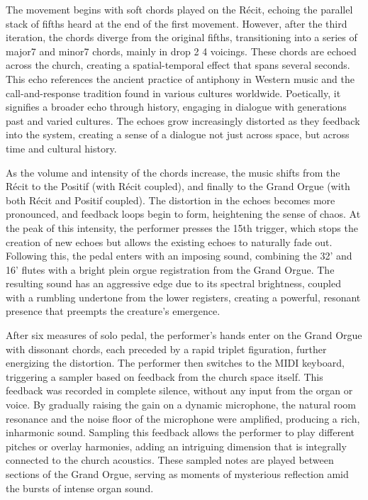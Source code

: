 \documentclass[12pt,twoside,maitrise]{dms_ks}
\theoremstyle{definition}
\begin{document}
{The movement begins with soft chords played on the Récit, echoing the parallel stack of fifths heard at the end of the first movement. 
However, after the third iteration, the chords diverge from the original fifths, transitioning into a series of major7 and minor7 chords, mainly in drop 2 4 voicings. 
These chords are echoed across the church, creating a spatial-temporal effect that spans several seconds. 
This echo references the ancient practice of antiphony in Western music and the call-and-response tradition found in various cultures worldwide. 
Poetically, it signifies a broader echo through history, engaging in dialogue with generations past and varied cultures. 
The echoes grow increasingly distorted as they feedback into the system, creating a sense of a dialogue not just across space, but across time and cultural history.


As the volume and intensity of the chords increase, the music shifts from the Récit to the Positif (with Récit coupled), and finally to the Grand Orgue (with both Récit and Positif coupled). 
The distortion in the echoes becomes more pronounced, and feedback loops begin to form, heightening the sense of chaos. 
At the peak of this intensity, the performer presses the 15th trigger, which stops the creation of new echoes but allows the existing echoes to naturally fade out. 
Following this, the pedal enters with an imposing sound, combining the 32' and 16' flutes with a bright plein orgue registration from the Grand Orgue. 
The resulting sound has an aggressive edge due to its spectral brightness, coupled with a rumbling undertone from the lower registers, creating a powerful, resonant presence that preempts the creature’s emergence.

After six measures of solo pedal, the performer’s hands enter on the Grand Orgue with dissonant chords, each preceded by a rapid triplet figuration, further energizing the distortion. 
The performer then switches to the MIDI keyboard, triggering a sampler based on feedback from the church space itself. 
This feedback was recorded in complete silence, without any input from the organ or voice. 
By gradually raising the gain on a dynamic microphone, the natural room resonance and the noise floor of the microphone were amplified, producing a rich, inharmonic sound. 
Sampling this feedback allows the performer to play different pitches or overlay harmonies, adding an intriguing dimension that is integrally connected to the church acoustics. 
These sampled notes are played between sections of the Grand Orgue, serving as moments of mysterious reflection amid the bursts of intense organ sound.

}
\end{document}

